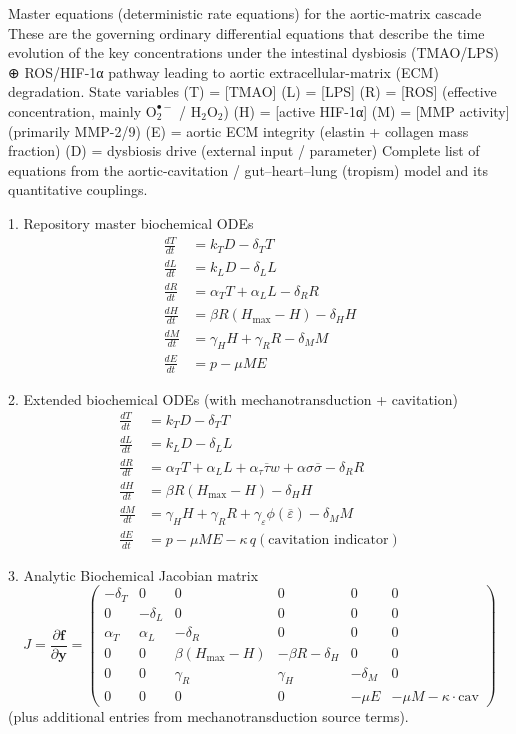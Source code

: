 Master equations (deterministic rate equations) for the aortic-matrix cascade
These are the governing ordinary differential equations that describe the time evolution of the key concentrations under the intestinal dysbiosis (TMAO/LPS) ⊕ ROS/HIF-1α pathway leading to aortic extracellular-matrix (ECM) degradation.
State variables
(T) = [TMAO]
(L) = [LPS]
(R) = [ROS] (effective concentration, mainly \(\mathrm{O_2^{\bullet-}}\) / \(\mathrm{H_2O_2}\))
(H) = [active HIF-1α]
(M) = [MMP activity] (primarily MMP-2/9)
(E) = aortic ECM integrity (elastin + collagen mass fraction)
(D) = dysbiosis drive (external input / parameter)
Complete list of equations from the aortic-cavitation / gut–heart–lung (tropism) model and its quantitative couplings.

1. Repository master biochemical ODEs
\[
\begin{align*}
\frac{dT}{dt} &= k_T D - \delta_T T \\
\frac{dL}{dt} &= k_L D - \delta_L L \\
\frac{dR}{dt} &= \alpha_T T + \alpha_L L - \delta_R R \\
\frac{dH}{dt} &= \beta R (H_{\max} - H) - \delta_H H \\
\frac{dM}{dt} &= \gamma_H H + \gamma_R R - \delta_M M \\
\frac{dE}{dt} &= p - \mu M E
\end{align*}
\]

2. Extended biochemical ODEs (with mechanotransduction + cavitation)
\[
\begin{align*}
\frac{dT}{dt} &= k_T D - \delta_T T \\
\frac{dL}{dt} &= k_L D - \delta_L L \\
\frac{dR}{dt} &= \alpha_T T + \alpha_L L + \alpha_\tau \overline{\tau}w + \alpha\sigma \overline{\sigma} - \delta_R R \\
\frac{dH}{dt} &= \beta R (H_{\max} - H) - \delta_H H \\
\frac{dM}{dt} &= \gamma_H H + \gamma_R R + \gamma_\varepsilon \phi(\overline{\varepsilon}) - \delta_M M \\
\frac{dE}{dt} &= p - \mu M E - \kappa\, q(\text{cavitation indicator})
\end{align*}
\]

3. Analytic Biochemical Jacobian matrix
\[
J = \frac{\partial\mathbf{f}}{\partial\mathbf{y}} =
\begin{pmatrix}
-\delta_T & 0 & 0 & 0 & 0 & 0 \\
0 & -\delta_L & 0 & 0 & 0 & 0 \\
\alpha_T & \alpha_L & -\delta_R & 0 & 0 & 0 \\
0 & 0 & \beta(H_{\max}-H) & -\beta R-\delta_H & 0 & 0 \\
0 & 0 & \gamma_R & \gamma_H & -\delta_M & 0 \\
0 & 0 & 0 & 0 & -\mu E & -\mu M - \kappa\cdot\text{cav}
\end{pmatrix}
\]
(plus additional entries from mechanotransduction source terms).

